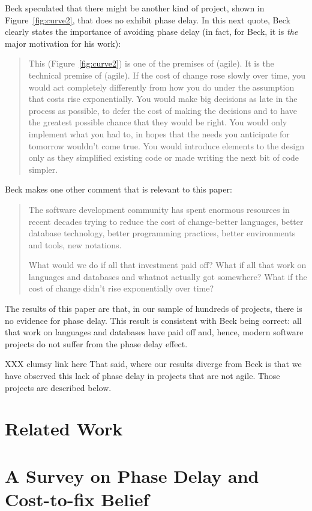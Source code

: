 \documentclass{sig-alternate}
\newcommand{\fig}[1]{Figure~\ref{fig:#1}}
\begin{document}
Beck speculated that there might be another kind of project, shown in \fig{curve2},
that does no exhibit phase delay. In this next quote, Beck clearly states
the importance of avoiding phase delay (in fact, for Beck, it is {\em the} major
motivation for his work):
\begin{quote}
This (\fig{curve2}) is one of the premises of (agile). It is the technical premise of (agile). If the cost of change rose slowly over time, you would act completely differently from how you do under the assumption that costs rise exponentially. You would make big decisions as late in the process as possible, to defer the cost of making the decisions and to have the greatest possible chance that they would be right. You would only implement what you had to, in hopes that the needs you anticipate for tomorrow wouldn't come true. You would introduce elements to the design only as they simplified existing code or made writing the next bit of code simpler.~\cite{beck00}
\end{quote}
Beck makes one other comment that is relevant to this paper: 
\begin{quote}
The software development community has spent enormous resources in recent decades trying to reduce the cost of change-better languages, better database technology, better programming practices, better environments and tools, new notations.

What would we do if all that investment paid off? What if all that work on languages and databases and whatnot actually got somewhere? What if the cost of change didn't rise exponentially over time?~\cite{beck00}
\end{quote}
The results of this paper are that, in our sample of hundreds of projects, there is no evidence for phase delay.
This result is   consistent with Beck being correct: all that work on    languages and databases
have paid off and, hence, modern software projects do not suffer from the  phase delay effect.  

XXX clumsy link here
That said, where our results
diverge from Beck is that we have observed this lack of phase delay in  projects that are not agile. Those
projects are described below.

\section{Related Work}
 



\section{A Survey on Phase Delay and Cost-to-fix Belief}
\label{survey}
\end{document}
